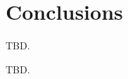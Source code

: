 \documentclass{aa}
\begin{document}

\section{Conclusions}

TBD.

\begin{acknowledgements}
TBD.
\end{acknowledgements}




\end{document}
